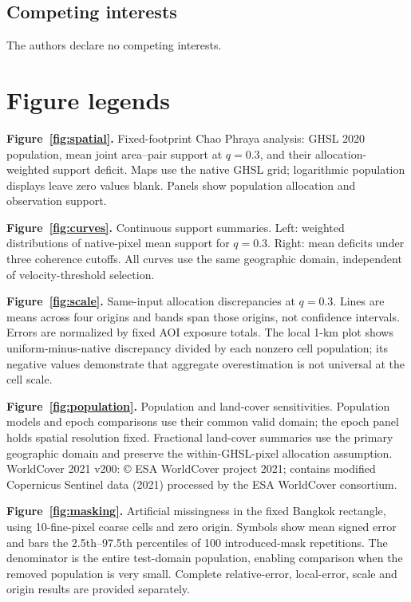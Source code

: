 \documentclass[pdflatex,sn-nature]{sn-jnl}
\begin{document}
\subsection*{Competing interests}
The authors declare no competing interests.
\section*{Figure legends}

\noindent\textbf{Figure~\ref{fig:spatial}.} Fixed-footprint Chao Phraya analysis: GHSL 2020 population, mean joint area--pair support at $q=0.3$, and their allocation-weighted support deficit. Maps use the native GHSL grid; logarithmic population displays leave zero values blank. Panels show population allocation and observation support.

\noindent\textbf{Figure~\ref{fig:curves}.} Continuous support summaries. Left: weighted distributions of native-pixel mean support for $q=0.3$. Right: mean deficits under three coherence cutoffs. All curves use the same geographic domain, independent of velocity-threshold selection.

\noindent\textbf{Figure~\ref{fig:scale}.} Same-input allocation discrepancies at $q=0.3$. Lines are means across four origins and bands span those origins, not confidence intervals. Errors are normalized by fixed AOI exposure totals. The local 1-km plot shows uniform-minus-native discrepancy divided by each nonzero cell population; its negative values demonstrate that aggregate overestimation is not universal at the cell scale.

\noindent\textbf{Figure~\ref{fig:population}.} Population and land-cover sensitivities. Population models and epoch comparisons use their common valid domain; the epoch panel holds spatial resolution fixed. Fractional land-cover summaries use the primary geographic domain and preserve the within-GHSL-pixel allocation assumption. WorldCover 2021 v200: \copyright{} ESA WorldCover project 2021; contains modified Copernicus Sentinel data (2021) processed by the ESA WorldCover consortium.

\noindent\textbf{Figure~\ref{fig:masking}.} Artificial missingness in the fixed Bangkok rectangle, using 10-fine-pixel coarse cells and zero origin. Symbols show mean signed error and bars the 2.5th--97.5th percentiles of 100 introduced-mask repetitions. The denominator is the entire test-domain population, enabling comparison when the removed population is very small. Complete relative-error, local-error, scale and origin results are provided separately.
\end{document}
